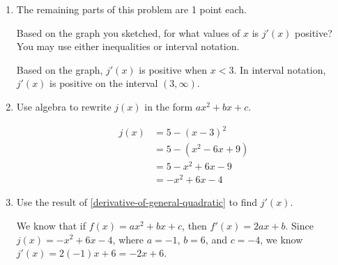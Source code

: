 \documentclass{article}
\begin{document}
\begin{enumerate}
\begin{enumerate}
\begin{solution}
    \end{solution}

  \item \label{shifted-quadratic-positive-derivative}

    \begin{grading}
      The remaining parts of this problem are 1 point each.
    \end{grading}

    \begin{problem}[\nstretch{0.5}]
      Based on the graph you sketched, for what values of $x$ is $j'(x)$ positive? You may use either inequalities or interval notation.
    \end{problem}

    \begin{solution}
      Based on the graph, $j'(x)$ is positive when $x<3$. In interval notation, $j'(x)$ is positive on the interval $(3, \infty)$.
    \end{solution}

  \item

    \begin{problem}[\stretch{0.5}]
      Use algebra to rewrite $j(x)$ in the form $ax^2 + bx + c$.
    \end{problem}

    \begin{solution}
      \begin{align*}
        j(x) &= 5-(x-3)^2 \\
        &= 5-(x^2 - 6x + 9) \\
        &= 5 - x^2 + 6x - 9 \\
        &= -x^2 + 6x - 4
      \end{align*}
    \end{solution}

  \item \label{shifted-quadratic-j'}

    \begin{problem}[\stretch{0.25}]
      Use the result of \ref{derivative-of-general-quadratic} to find $j'(x)$. 
    \end{problem}

    \begin{solution}
      We know that if $f(x)=ax^2+bx+c$, then $f'(x)=2ax+b$. Since $j(x) = -x^2 + 6x - 4$, where
      $a = -1$, $b=6$, and $c=-4$, we know
      $j'(x) = 2(-1)x + 6 = -2x+6$. 
    \end{solution}


\end{enumerate}
\end{enumerate}
\end{document}
